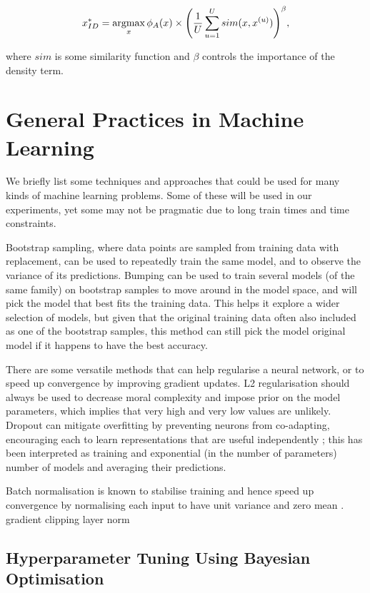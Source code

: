 \begin{equation}
 x^*_{ID} = \operatorname*{argmax}_x \phi_A(x) \times \Bigg( \frac{1}{U} \sum_{u=1}^U sim(x, x^{(u)}) \Bigg)^\beta,
\end{equation}

where $sim$ is some similarity function and $\beta$ controls the importance of the density term.

\section{General Practices in Machine Learning}

We briefly list some techniques and approaches that could be used for many kinds of machine learning problems.
Some of these will be used in our experiments, yet some may not be pragmatic due to long train times and time constraints.

Bootstrap sampling, where data points are sampled from training data with replacement, can be used to repeatedly train the same model, and to observe the variance of its predictions.
Bumping can be used to train several models (of the same family) on bootstrap samples to move around in the model space, and will pick the model that best fits the training data.
This helps it explore a wider selection of models, but given that the original training data often also included as one of the bootstrap samples, this method  can still pick the model original model if it happens to have the best accuracy.

There are some versatile methods that can help regularise a neural network, or to speed up convergence by improving  gradient updates.
L2  regularisation should always be used to decrease moral complexity and impose prior on the model parameters, which  implies that very high and very low values are unlikely.
Dropout can mitigate overfitting by preventing neurons from co-adapting, encouraging each to learn representations that are useful independently \cite{dropout}; this has been interpreted as training and exponential (in the number of parameters) number of models and averaging their predictions.

Batch normalisation is known to stabilise training and hence speed up convergence  by normalising each input to have unit variance and zero mean \cite{batch_norm}.
gradient clipping
layer norm

\subsection{Hyperparameter Tuning Using Bayesian Optimisation}
\label{bayesian_opt}

